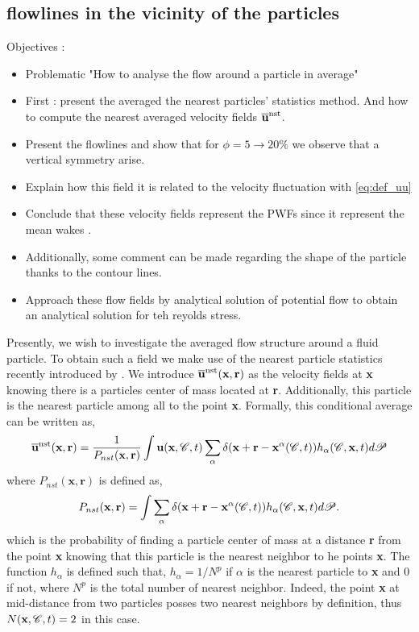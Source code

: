 

\subsection{flowlines in the vicinity of the particles}
Objectives : 
\begin{itemize}
    \item Problematic "How to analyse the flow around a particle in average"
    \item First : present the averaged the nearest particles' statistics method. And how to compute the nearest averaged velocity fields $\overline{\textbf{u}}^\text{nst}$.
    \item Present the flowlines and show that for $\phi = 5 \rightarrow 20\%$ we observe that a vertical symmetry arise.
    \item Explain how this field it is related to the velocity fluctuation with \ref{eq:def_uu}
    \item Conclude that these velocity fields represent the PWFs since it represent the mean wakes \citep{du2022analysis}.  
    \item Additionally, some comment can be made regarding the shape of the particle thanks to the contour lines. 
    \item Approach these flow fields by analytical solution of potential flow to obtain an analytical solution for teh reyolds stress. 
\end{itemize}

Presently, we wish to investigate the  averaged flow structure around a fluid particle.
To obtain such a field we make use of the nearest particle statistics recently introduced by \citet{zhang2021stress}. 
We introduce $\overline{\textbf{u}}^\text{nst}(\textbf{x},\textbf{r})$ as the velocity fields at \textbf{x} knowing there is a particles center of mass located at \textbf{r}.
Additionally, this particle is the nearest particle among all to the point \textbf{x}.  
Formally, this conditional average can be written as, 
\begin{equation}
    \overline{\textbf{u}}^\text{nst}(\textbf{x},\textbf{r})=\frac{1}{P_{nst}(\textbf{x},\textbf{r})} 
    \int \textbf{u}(\textbf{x},\mathscr{C},t) 
    \sum_{\alpha}\delta(\textbf{x}+\textbf{r}-\textbf{x}^\alpha(\mathscr{C},t)) h_{\alpha}(\mathscr{C},\textbf{x},t) d\mathscr{P} 
    \label{eq:q_nst_avg}
\end{equation}
where $P_{nst}(\textbf{x},\textbf{r})$ is defined as,  
\begin{equation}
    P_{nst}(\textbf{x},\textbf{r})= 
    \int
    \sum_{\alpha}\delta(\textbf{x}+\textbf{r}-\textbf{x}^\alpha(\mathscr{C},t)) 
    h_\alpha(\mathscr{C},\textbf{x},t) d\mathscr{P}. 
    \label{eq:P_nsti}
\end{equation}
which is the probability of finding a particle center of mass at a distance \textbf{r} from the point \textbf{x} knowing that this particle is the nearest neighbor to he points \textbf{x}. 
The function $h_\alpha$ is defined such that, $h_\alpha = 1/N^p$ if $\alpha$ is the nearest particle to \textbf{x} and $0$ if not, where $N^p$ is the total number of nearest neighbor.
Indeed, the point \textbf{x} at mid-distance from two particles posses two nearest neighbors by definition, thus $N(\textbf{x},\mathscr{C},t) = 2$ in this case. 

